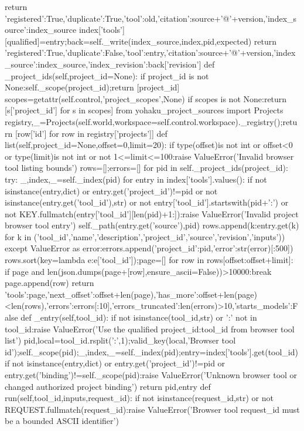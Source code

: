    return {'registered':True,'duplicate':True,'tool':old,'citation':source+'@'+version,'index_source':index_source}
  index['tools'][qualified]=entry;back=self._write(index_source,index,pid,expected)
  return {'registered':True,'duplicate':False,'tool':entry,'citation':source+'@'+version,'index_source':index_source,'index_revision':back['revision']}
 def _project_ids(self,project_id=None):
  if project_id is not None:self._scope(project_id);return [project_id]
  scopes=getattr(self.control,'project_scopes',None)
  if scopes is not None:return [s['project_id'] for s in scopes]
  from yohaku_project_sources import Projects
  registry,_=Projects(self.world,workspace=self.control.workspace)._registry();return [row['id'] for row in registry['projects']]
 def list(self,project_id=None,offset=0,limit=20):
  if type(offset)is not int or offset<0 or type(limit)is not int or not 1<=limit<=100:raise ValueError('Invalid browser tool listing bounds')
  rows=[];errors=[]
  for pid in self._project_ids(project_id):
   try:
    _,index,_=self._index(pid)
    for entry in index['tools'].values():
     if not isinstance(entry,dict) or entry.get('project_id')!=pid or not isinstance(entry.get('tool_id'),str) or not entry['tool_id'].startswith(pid+':') or not KEY.fullmatch(entry['tool_id'][len(pid)+1:]):raise ValueError('Invalid project browser tool entry')
     self._path(entry.get('source'),pid)
     rows.append({k:entry.get(k) for k in ('tool_id','name','description','project_id','source','revision','inputs')})
   except ValueError as error:errors.append({'project_id':pid,'error':str(error)[:500]})
  rows.sort(key=lambda e:e['tool_id']);page=[]
  for row in rows[offset:offset+limit]:
   if page and len(json.dumps(page+[row],ensure_ascii=False))>10000:break
   page.append(row)
  return {'tools':page,'next_offset':offset+len(page),'has_more':offset+len(page)<len(rows),'errors':errors[:10],'errors_truncated':len(errors)>10,'starts_models':False}
 def _entry(self,tool_id):
  if not isinstance(tool_id,str) or ':' not in tool_id:raise ValueError('Use the qualified project_id:tool_id from browser tool list')
  pid,local=tool_id.rsplit(':',1);valid_key(local,'Browser tool id');self._scope(pid);_,index,_=self._index(pid);entry=index['tools'].get(tool_id)
  if not isinstance(entry,dict) or entry.get('project_id')!=pid or entry.get('binding')!=self._scope(pid):raise ValueError('Unknown browser tool or changed authorized project binding')
  return pid,entry
 def run(self,tool_id,inputs,request_id):
  if not isinstance(request_id,str) or not REQUEST.fullmatch(request_id):raise ValueError('Browser tool request_id must be a bounded ASCII identifier')
